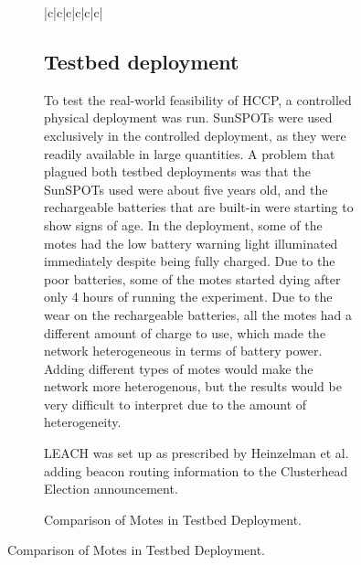 \begin{figure}
\begin{figure}
\begin{table}
\begin{center}
\begin{scriptsizetabular}{|c|c|c|c|c|c|}
\end{scriptsizetabular}
\caption[Comparison of Motes in Testbed Deployment]{Comparison of Motes in Testbed Deployment.}
\label{itsaTable}
\end{center}
\end{table}
% 

\subsection{Testbed deployment}

To test the real-world feasibility of HCCP, a controlled physical deployment was run. 
SunSPOTs were used exclusively in the controlled deployment, as they were 
readily available in large quantities. A problem that plagued both  testbed deployments was that 
the SunSPOTs used were about five years old, and the rechargeable batteries that 
are built-in were starting to show signs of age. In the deployment, some of the motes
had the low battery warning light illuminated immediately despite being
fully charged. Due to the poor batteries, some of the motes
started dying after only 4 hours of running the experiment.
Due to the wear on the rechargeable batteries,
all the motes had a different amount of charge to use, which made the network
heterogeneous in terms of battery power. Adding different types of motes would
make the network more heterogenous, but the results would be very difficult to interpret due to the
amount of heterogeneity.



LEACH was set up as prescribed by Heinzelman et al.~\cite{leach} adding beacon routing information to the
Clusterhead Election announcement.


\end{figure}
\end{figure}
